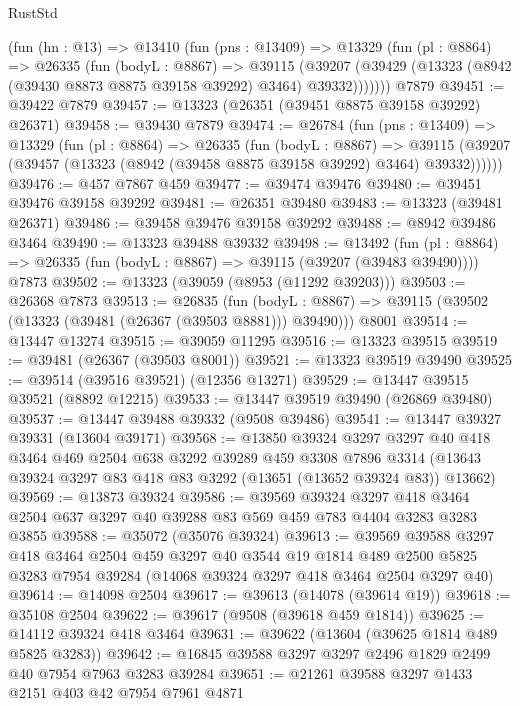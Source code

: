 \begin{lexlean}{RustStd}
\begin{coremodule}
    (fun (hn : @13) =>
    @13410
      (fun (pns : @13409) =>
      @13329
        (fun (pl : @8864) =>
        @26335
          (fun (bodyL : @8867) =>
          @39115
            (@39207 (@39429 (@13323 (@8942 (@39430 @8873 @8875 @39158 @39292) @3464) @39332)))))))
    @7879
@39451 := @39422 @7879
@39457 := @13323 (@26351 (@39451 @8875 @39158 @39292) @26371)
@39458 := @39430 @7879
@39474 := @26784
    (fun (pns : @13409) =>
    @13329
      (fun (pl : @8864) =>
      @26335
        (fun (bodyL : @8867) =>
        @39115 (@39207 (@39457 (@13323 (@8942 (@39458 @8875 @39158 @39292) @3464) @39332))))))
@39476 := @457 @7867 @459
@39477 := @39474 @39476
@39480 := @39451 @39476 @39158 @39292
@39481 := @26351 @39480
@39483 := @13323 (@39481 @26371)
@39486 := @39458 @39476 @39158 @39292
@39488 := @8942 @39486 @3464
@39490 := @13323 @39488 @39332
@39498 := @13492
    (fun (pl : @8864) => @26335 (fun (bodyL : @8867) => @39115 (@39207 (@39483 @39490))))
    @7873
@39502 := @13323 (@39059 (@8953 (@11292 @39203)))
@39503 := @26368 @7873
@39513 := @26835
    (fun (bodyL : @8867) => @39115 (@39502 (@13323 (@39481 (@26367 (@39503 @8881))) @39490)))
    @8001
@39514 := @13447 @13274
@39515 := @39059 @11295
@39516 := @13323 @39515
@39519 := @39481 (@26367 (@39503 @8001))
@39521 := @13323 @39519 @39490
@39525 := @39514 (@39516 @39521) (@12356 @13271)
@39529 := @13447 @39515 @39521 (@8892 @12215)
@39533 := @13447 @39519 @39490 (@26869 @39480)
@39537 := @13447 @39488 @39332 (@9508 @39486)
@39541 := @13447 @39327 @39331 (@13604 @39171)
@39568 := @13850
    @39324
    @3297
    @3297
    @40
    @418
    @3464
    @469
    @2504
    @638
    @3292
    @39289
    @459
    @3308
    @7896
    @3314
    (@13643 @39324 @3297 @83 @418 @83 @3292 (@13651 (@13652 @39324 @83)) @13662)
@39569 := @13873 @39324
@39586 := @39569
    @39324
    @3297
    @418
    @3464
    @2504
    @637
    @3297
    @40
    @39288
    @83
    @569
    @459
    @783
    @4404
    @3283
    @3283
    @3855
@39588 := @35072 (@35076 @39324)
@39613 := @39569
    @39588
    @3297
    @418
    @3464
    @2504
    @459
    @3297
    @40
    @3544
    @19
    @1814
    @489
    @2500
    @5825
    @3283
    @7954
    @39284
    (@14068 @39324 @3297 @418 @3464 @2504 @3297 @40)
@39614 := @14098 @2504
@39617 := @39613 (@14078 (@39614 @19))
@39618 := @35108 @2504
@39622 := @39617 (@9508 (@39618 @459 @1814))
@39625 := @14112 @39324 @418 @3464
@39631 := @39622 (@13604 (@39625 @1814 @489 @5825 @3283))
@39642 := @16845 @39588 @3297 @3297 @2496 @1829 @2499 @40 @7954 @7963 @3283 @39284
@39651 := @21261 @39588 @3297 @1433 @2151 @403 @42 @7954 @7961 @4871

\end{coremodule}
\end{lexlean}

